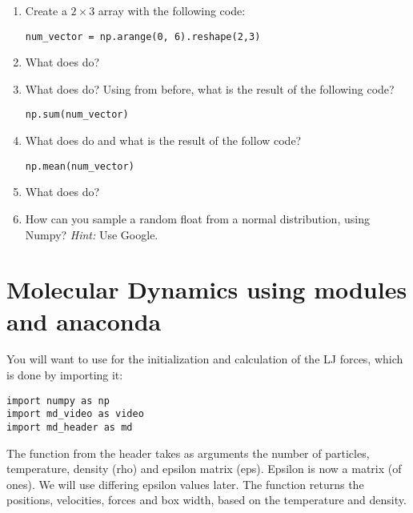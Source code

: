 \documentclass{article}
\begin{document}
\begin{enumerate}[resume]
   \item Create a $2\times 3$ array with the following code:

\begin{lstlisting}
num_vector = np.arange(0, 6).reshape(2,3)
\end{lstlisting}

   \item What does  do?

   \item What does  do? Using  from before, what is the result of the following code?

\begin{lstlisting}
np.sum(num_vector)
\end{lstlisting}


   \item What does  do and what is the result of the follow code?

\begin{lstlisting}
np.mean(num_vector)
\end{lstlisting}

   \item What does  do?

   \item How can you sample a random float from a normal distribution, using Numpy? \newline
       {\em Hint:} Use Google.

\end{enumerate}


\newpage


\section{Molecular Dynamics using modules and anaconda}

You will want to use  for the initialization and calculation of the LJ forces, which is done by importing it:

\begin{lstlisting}
import numpy as np
import md_video as video
import md_header as md
\end{lstlisting}

The  function from the header takes as arguments
the number of particles, temperature, density (rho) and epsilon matrix (eps).
Epsilon is now a matrix (of ones). We will use differing epsilon values later.
The function returns the positions, velocities, forces and box width, based on the temperature and density.
\end{document}
